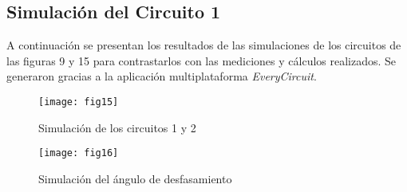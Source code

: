 \documentclass[a4paper,12pt]{article}
\begin{document}
\subsection{Simulación del Circuito 1}

A continuación se presentan los resultados de las simulaciones de los circuitos de las figuras 9 y 15 para contrastarlos con las mediciones y cálculos realizados. Se generaron gracias a la aplicación multiplataforma \textit{EveryCircuit}\texttrademark. \\


\begin{figure}[!h]
\centering
	\texttt{[image: fig15]}
	\caption{Simulación de los circuitos 1 y 2}
\end{figure}

\begin{figure}[!h]
\centering
	\texttt{[image: fig16]}
	 \caption{Simulación del ángulo de desfasamiento}
\end{figure}
\end{document}
